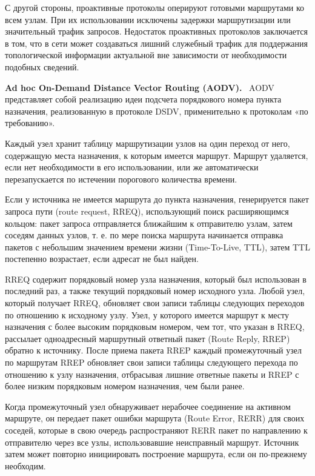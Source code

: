 \documentclass[14pt,a4paper,titlepage]{extarticle}
\renewcommand{\paragraph}[1]{\textbf{#1.}~}
\begin{document}
С другой стороны, проактивные протоколы оперируют готовыми маршрутами ко всем узлам. При их использовании исключены задержки маршрутизации или значительный трафик запросов. Недостаток проактивных протоколов заключается в том, что в сети может создаваться лишний служебный трафик для поддержания топологической информации актуальной вне зависимости от необходимости подобных сведений. 

\paragraph{Ad hoc On-Demand Distance Vector Routing (AODV)}
AODV представляет собой реализацию идеи подсчета порядкового номера пункта назначения, реализованную в протоколе DSDV, применительно к протоколам «по требованию».

Каждый узел хранит таблицу маршрутизации узлов на один переход от него, содержащую места назначения, к которым имеется маршрут. Маршрут удаляется, если нет необходимости в его использовании, или же автоматически перезапускается по истечении порогового количества времени. 

Если у источника не имеется маршрута до пункта назначения, генерируется пакет запроса пути (route request, RREQ), использующий поиск расширяющимся кольцом: пакет запроса отправляется ближайшим к отправителю узлам, затем соседям данных узлов, т. е. по мере поиска маршрута начинается отправка пакетов с небольшим значением времени жизни (Time-To-Live, TTL), затем TTL постепенно возрастает, если адресат не был найден. 

RREQ содержит порядковый номер узла назначения, который был использован в последний раз, а также текущий порядковый номер исходного узла. Любой узел, который получает RREQ, обновляет свои записи таблицы следующих переходов по отношению к исходному узлу. Узел, у которого имеется маршрут к месту назначения с более высоким порядковым номером, чем тот, что указан в RREQ, рассылает одноадресный маршрутный ответный пакет (Route Reply, RREP) обратно к источнику. После приема пакета RREP каждый промежуточный узел по маршрутам RREP обновляет свои записи таблицы следующего перехода по отношению к узлу назначения, отбрасывая лишние ответные пакеты и RREP с более низким порядковым номером назначения, чем были ранее. 

Когда промежуточный узел обнаруживает нерабочее соединение на активном маршруте, он передает пакет ошибки маршрута (Route Error, RERR) для своих соседей, которые в свою очередь распространяют RERR пакет по направлению к отправителю через все узлы, использовавшие неисправный маршрут. Источник затем может повторно инициировать построение маршрута, если он по-прежнему необходим.
\end{document}
